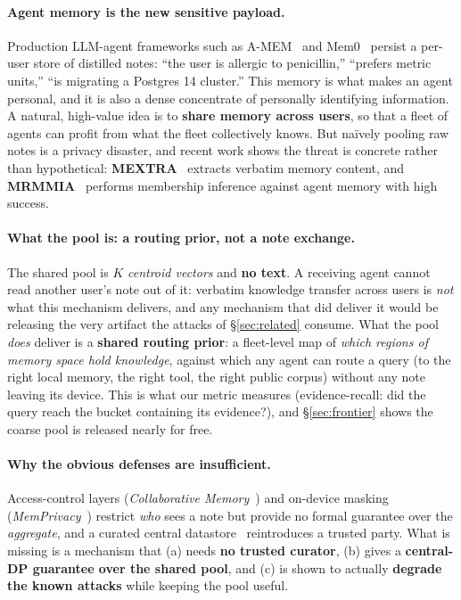 \documentclass[pdflatex,sn-mathphys-num,12pt]{sn-jnl}
\theoremstyle{thmstyleone}%
\theoremstyle{thmstyletwo}%
\theoremstyle{thmstylethree}%
\newcommand{\secref}[1]{\S\ref{#1}}
\begin{document}
\paragraph{Agent memory is the new sensitive payload.}
Production LLM-agent frameworks such as A-MEM~\cite{xu2024amem} and
Mem0~\cite{chhikara2024mem0} persist a per-user store of distilled notes:
``the user is allergic to penicillin,'' ``prefers metric units,'' ``is migrating
a Postgres 14 cluster.'' This memory is what makes an agent personal, and it is
also a dense concentrate of personally identifying information. A natural,
high-value idea is to \textbf{share memory across users}, so that a fleet of
agents can profit from what the fleet collectively knows. But na\"ively pooling
raw notes is a privacy disaster, and recent work shows the threat is concrete
rather than hypothetical: \textbf{MEXTRA}~\cite{wang2025mextra} extracts verbatim
memory content, and \textbf{MRMMIA}~\cite{chen2026mrmmia} performs membership
inference against agent memory with high success.

\paragraph{What the pool is: a routing prior, not a note exchange.}
The shared pool is $K$ \emph{centroid vectors} and \textbf{no text}. A receiving
agent cannot read another user's note out of it: verbatim knowledge transfer
across users is \emph{not} what this mechanism delivers, and any mechanism that
did deliver it would be releasing the very artifact the attacks of
\secref{sec:related} consume. What the pool \emph{does} deliver is a
\textbf{shared routing prior}: a fleet-level map of \emph{which regions of memory
space hold knowledge}, against which any agent can route a query (to the right
local memory, the right tool, the right public corpus) without any note leaving
its device. This is what our metric measures (evidence-recall: did the query
reach the bucket containing its evidence?), and \secref{sec:frontier} shows the
coarse pool is released nearly for free.

\paragraph{Why the obvious defenses are insufficient.}
Access-control layers (\emph{Collaborative Memory}~\cite{rezazadeh2025collabmem})
and on-device masking (\emph{MemPrivacy}~\cite{chen2026memprivacy}) restrict
\emph{who} sees a note but provide no formal guarantee over the \emph{aggregate},
and a curated central datastore~\cite{abouelenein2026dpdatastore} reintroduces a
trusted party. What is missing is a mechanism that (a) needs \textbf{no trusted
curator}, (b) gives a \textbf{central-DP guarantee over the shared pool}, and
(c) is shown to actually \textbf{degrade the known attacks} while keeping the
pool useful.
\end{document}
